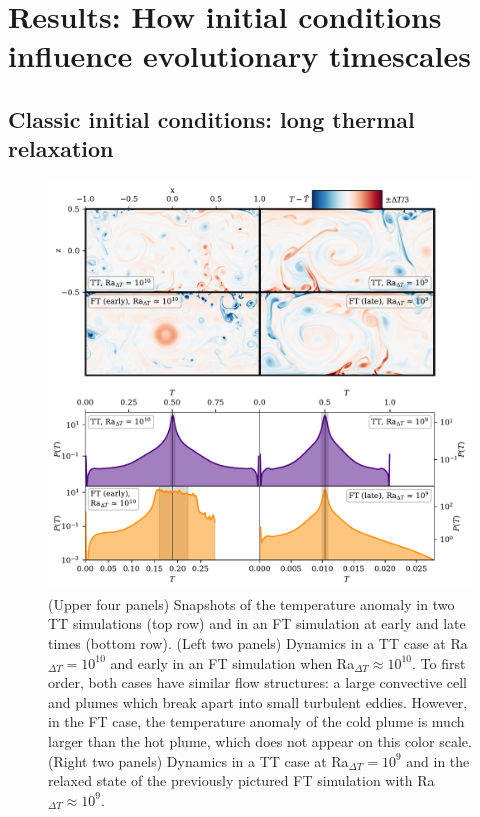 \documentclass[aps, pre, onecolumn, nofootinbib, notitlepage, groupedaddress, amsfonts, amssymb, amsmath, longbibliography, superscriptaddress]{revtex4-1}
\begin{document}
\section{Results: How initial conditions influence evolutionary timescales}
\label{sec:results_timescales}

\subsection{Classic initial conditions: long thermal relaxation}
\label{sec:time_evolution_classic_ICs}

\begin{figure}[p!]
\includegraphics[width=\textwidth]{./figs/rbc_evolution_dynamics.pdf}
\caption{ 
	(Upper four panels) Snapshots of the temperature anomaly in two TT simulations (top row) and in an FT simulation at early and late times (bottom row).
	(Left two panels) Dynamics in a TT case at Ra$_{\Delta T} = 10^{10}$ and early in an FT simulation when Ra$_{\Delta T} \approx 10^{10}$.
	To first order, both cases have similar flow structures: a large convective cell and plumes which break apart into small turbulent eddies.
	However, in the FT case, the temperature anomaly of the cold plume is much larger than the hot plume, which does not appear on this color scale.
	(Right two panels) Dynamics in a TT case at Ra$_{\Delta T} = 10^9$ and in the relaxed state of the previously pictured FT simulation with Ra$_{\Delta T} \approx 10^9$.
}
\end{figure}
\end{document}
